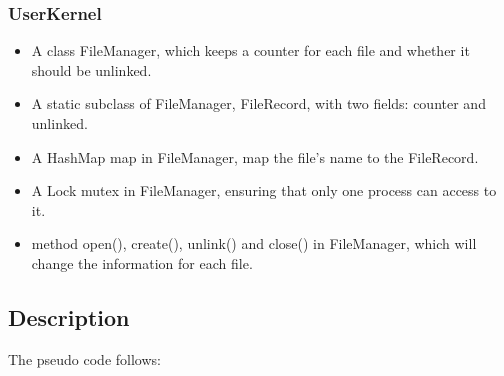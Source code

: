 \documentclass{article}
\begin{document}
	\subsubsection*{UserKernel}
	\begin{itemize}
		\item A class FileManager, which keeps a counter for each file and whether it should be unlinked.
		\item A static subclass of FileManager, FileRecord, with two fields: counter and unlinked.
		\item A HashMap map in FileManager, map the file's name to the FileRecord.
		\item A Lock mutex in FileManager, ensuring that only one process can access to it.
		\item method open(), create(), unlink() and close() in FileManager, which will change the information for each file.
	\end{itemize}
	\subsection{Description}
	The pseudo code follows:
\end{document}
